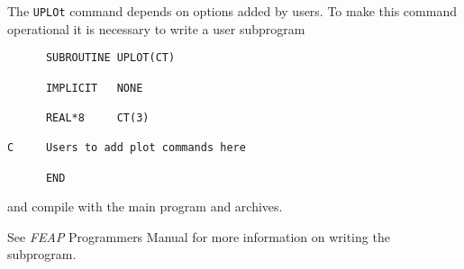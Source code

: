 \headb

The {\tt UPLOt} command depends on options added  by users.  To make this
command operational it is necessary to write a user subprogram
\begin{verbatim}
      SUBROUTINE UPLOT(CT)

      IMPLICIT   NONE

      REAL*8     CT(3)

C     Users to add plot commands here

      END
\end{verbatim}
and compile with the main program and archives.

See \textsl{FEAP} Programmers Manual for more information on writing the subprogram.
\vfill
\eject
